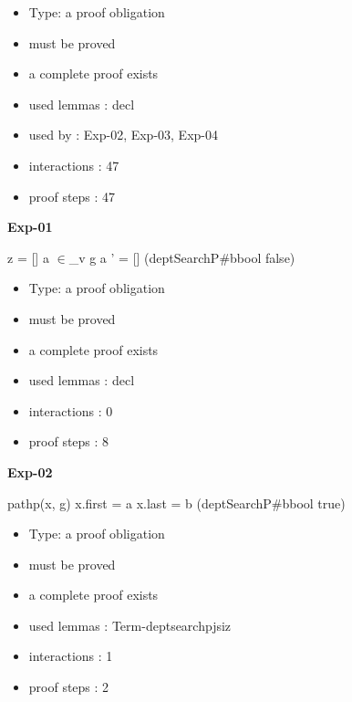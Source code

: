{\begin{itemize}
\item Type: a proof obligation

\item       must be proved
\item       a complete proof exists
\item       used lemmas  : decl
\item       used by      : Exp-02, Exp-03, Exp-04
\item       interactions : 47
\item       proof steps  : 47
\end{itemize}

\medskip

{\LARGE\bf Exp-01}

\medskip

 \Fol z = [] \And a $\in$\_v g \Or a ' = [] \Imp (\Do deptSearchP\#\Dc bbool \Equiv false)

\begin{itemize}

\item Type: a proof obligation

\item       must be proved
\item       a complete proof exists
\item       used lemmas  : decl
\item       interactions : 0
\item       proof steps  : 8
\end{itemize}

\medskip

{\LARGE\bf Exp-02}

\medskip

 \Fol pathp(x, g) \And x.first = a \And x.last = b \Imp (\Do deptSearchP\#\Dc bbool \Equiv true)

\begin{itemize}

\item Type: a proof obligation

\item       must be proved
\item       a complete proof exists
\item       used lemmas  : Term-deptsearchpjsiz
\item       interactions : 1
\item       proof steps  : 2
\end{itemize}

\medskip

}
